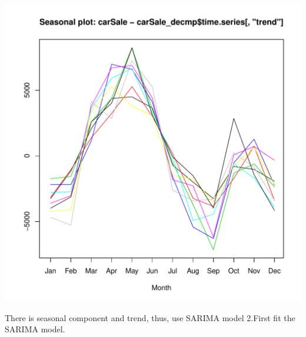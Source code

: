 \documentclass[10pt]{article}\usepackage[]{graphicx}\usepackage[]{color}
\makeatletter
\def\maxwidth{ %
  \ifdim\Gin@nat@width>\linewidth
    \linewidth
  \else
    \Gin@nat@width
  \fi
}
\newenvironment{knitrout}{}{} %
\makeatother
\begin{document}
\begin{knitrout}
\includegraphics[width=\maxwidth]{figure/unnamed-chunk-32-4} 

\end{knitrout}
There is seasonal component and trend, thus, use SARIMA model
\bigskip
2.First fit the SARIMA model.
\end{document}
